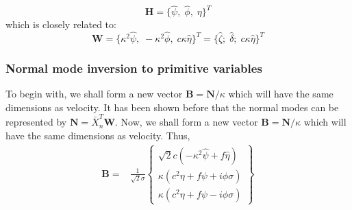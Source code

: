 $$\mathbf{H} = \{\hat \psi,\; \hat \phi,\;  \eta  \}^T$$
which is closely related to:
$$\mathbf{W}
    = \{\kappa^2\hat \psi,\; -\kappa^2\hat
    \phi,\; c\kappa\hat \eta  \}^T
    = \{\hat \zeta;\; \hat \delta;\;  c\kappa \hat \eta \}^T $$

\subsubsection{Normal mode inversion to primitive variables}
To begin with, we shall form a new vector $\mathbf{B} = \mathbf{N}/\kappa$
which will have the same dimensions as velocity.
It has been shown before that the normal modes can be represented by $\mathbf{N}
    = \bar{X}_n^T \mathbf{W}$. Now,  we shall form a new vector $\mathbf{B} =
    \mathbf{N}/\kappa$ which will have the same dimensions as velocity. Thus,
\begin{align}
    \mathbf{B}
    = & \frac{1}{\sqrt{2}\sigma}
    \begin{Bmatrix} \sqrt{2} c\left(-
        \kappa^{2} \hat \psi +  f\hat\eta \right)               \\
        \kappa \left(c^{2} \eta + f \psi + i \phi \sigma\right) \\
        \kappa \left(c^{2} \eta + f \psi - i \phi \sigma\right)
    \end{Bmatrix}
\end{align}

